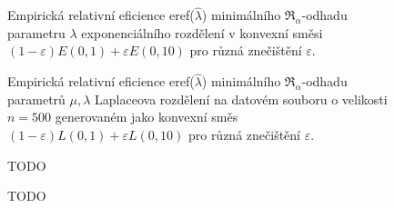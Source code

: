 \begin{figure}[htb]
	\begin{center}
		\caption{Empirická relativní eficience eref($\hat{\lambda}$) minimálního $\mathfrak{R}_\alpha$-odhadu parametru $\lambda$ exponenciálního rozdělení v konvexní směsi 
		$(1-\varepsilon)E(0,1) + \varepsilon E(0,10)$ pro různá znečištění $\varepsilon$.}
		\label{fig-eref-Exp-lambda}
	\end{center}
\end{figure}

\begin{figure}[htb]
	\begin{center}
		\caption{Empirická relativní eficience eref($\hat{\lambda}$) minimálního $\mathfrak{R}_\alpha$-odhadu parametrů  $\mu,\lambda$ Laplaceova rozdělení na datovém souboru o velikosti $n = 500$ generovaném	jako konvexní směs	$(1-\varepsilon)L(0,1) + \varepsilon L(0,10)$ pro různá znečištění $\varepsilon$.}
		\label{fig-eref-Laplace-lambda}
	\end{center}
\end{figure}

\begin{figure}[htb]
	\begin{center}
		\caption{ TODO }
		\label{fig-eref-Exp-mu}
	\end{center}
\end{figure}

\begin{figure}[htb]
	\begin{center}
		\caption{ TODO }
		\label{fig-eref-Laplace-mu}
	\end{center}
\end{figure}

